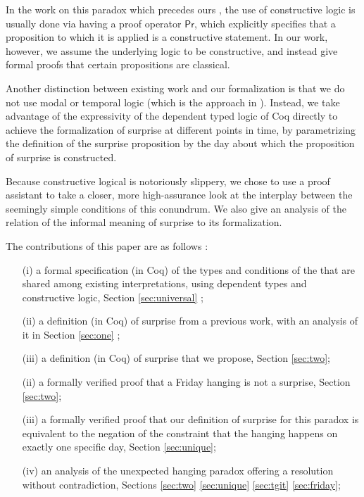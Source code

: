 \documentclass[journal]{journal}
\begin{document}
In the work on this paradox which precedes ours \cite{} \cite{}, the use of constructive logic is
usually done via having a proof operator $\mathsf{Pr}$, which explicitly specifies
that a proposition to which it is applied is a constructive statement. In our
work, however, we assume the underlying logic to be constructive, and instead
give formal proofs that certain propositions are classical.

Another distinction between existing work and our formalization is that
we do not use modal or temporal logic (which is the approach in \cite{modal}).
Instead, we take advantage of the expressivity of the dependent typed logic of Coq directly to
achieve the formalization of surprise at different points in time,
by parametrizing the definition of the surprise proposition
by the day about which the proposition of surprise is constructed.

Because constructive logical is notoriously slippery, we chose to use a proof
assistant to take a closer, more high-assurance look at the
interplay between the seemingly simple conditions of this conundrum.
We also give an analysis of the relation of the informal meaning of surprise
to its formalization.

The contributions of this paper are as follows :

\begin{itemize}
  \item[(i)] a formal specification (in Coq) of the types and conditions of the that
  are shared among existing interpretations, using dependent types and constructive logic,
  Section \ref{sec:universal} ;
  \item[(ii)] a definition (in Coq) of surprise from a previous work, with an analysis of it
  in Section \ref{sec:one} ;
  \item[(iii)] a definition (in Coq) of surprise that we propose,
  Section \ref{sec:two};
  \item[(ii)] a formally verified proof that a Friday hanging is not a surprise, Section \ref{sec:two};
  \item[(iii)] a formally verified proof that our definition of
  surprise for this paradox is equivalent to the negation of the
  constraint that the hanging happens on exactly one specific day, Section \ref{sec:unique};
  \item[(iv)] an analysis of the unexpected hanging paradox offering a resolution without
  contradiction, Sections \ref{sec:two} \ref{sec:unique} \ref{sec:tgit} \ref{sec:friday};
\end{itemize}
\end{document}

